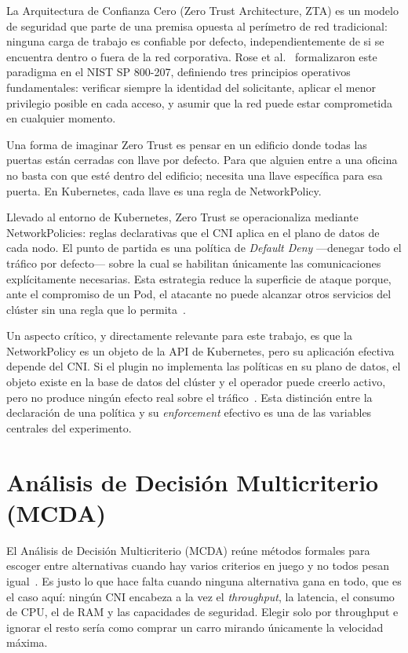 La Arquitectura de Confianza Cero (Zero Trust Architecture, ZTA) es un modelo de seguridad que parte de una premisa opuesta al perímetro de red tradicional: ninguna carga de trabajo es confiable por defecto, independientemente de si se encuentra dentro o fuera de la red corporativa. Rose et al.~\cite{ref24} formalizaron este paradigma en el NIST SP 800-207, definiendo tres principios operativos fundamentales: verificar siempre la identidad del solicitante, aplicar el menor privilegio posible en cada acceso, y asumir que la red puede estar comprometida en cualquier momento.

Una forma de imaginar Zero Trust es pensar en un edificio donde todas las puertas están cerradas con llave por defecto. Para que alguien entre a una oficina no basta con que esté dentro del edificio; necesita una llave específica para esa puerta. En Kubernetes, cada llave es una regla de NetworkPolicy.

Llevado al entorno de Kubernetes, Zero Trust se operacionaliza mediante NetworkPolicies: reglas declarativas que el CNI aplica en el plano de datos de cada nodo. El punto de partida es una política de \emph{Default Deny} ---denegar todo el tráfico por defecto--- sobre la cual se habilitan únicamente las comunicaciones explícitamente necesarias. Esta estrategia reduce la superficie de ataque porque, ante el compromiso de un Pod, el atacante no puede alcanzar otros servicios del clúster sin una regla que lo permita~\cite{ref24,ref25}.

Un aspecto crítico, y directamente relevante para este trabajo, es que la NetworkPolicy es un objeto de la API de Kubernetes, pero su aplicación efectiva depende del CNI. Si el plugin no implementa las políticas en su plano de datos, el objeto existe en la base de datos del clúster y el operador puede creerlo activo, pero no produce ningún efecto real sobre el tráfico~\cite{ref4}. Esta distinción entre la declaración de una política y su \emph{enforcement} efectivo es una de las variables centrales del experimento.

\section{Análisis de Decisión Multicriterio (MCDA)}

El Análisis de Decisión Multicriterio (MCDA) reúne métodos formales para escoger entre alternativas cuando hay varios criterios en juego y no todos pesan igual~\cite{ref34}. Es justo lo que hace falta cuando ninguna alternativa gana en todo, que es el caso aquí: ningún CNI encabeza a la vez el \emph{throughput}, la latencia, el consumo de CPU, el de RAM y las capacidades de seguridad. Elegir solo por throughput e ignorar el resto sería como comprar un carro mirando únicamente la velocidad máxima.

